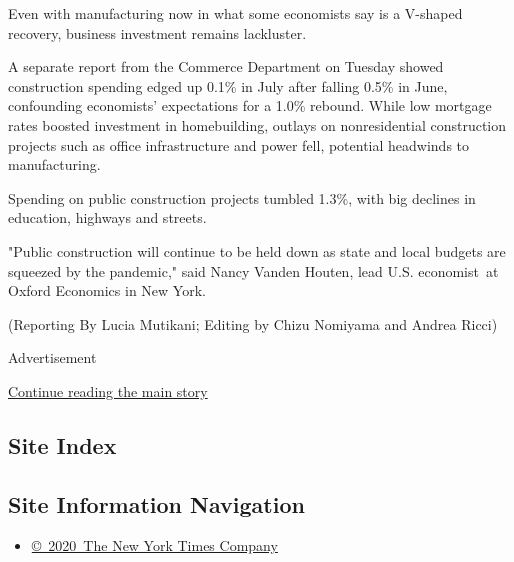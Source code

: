 Even with manufacturing now in what some economists say is a V-shaped
recovery, business investment remains lackluster.

A separate report from the Commerce Department on Tuesday showed
construction spending edged up 0.1\% in July after falling 0.5\% in
June, confounding economists' expectations for a 1.0\% rebound. While
low mortgage rates boosted investment in homebuilding, outlays on
nonresidential construction projects such as office infrastructure and
power fell, potential headwinds to manufacturing.

Spending on public construction projects tumbled 1.3\%, with big
declines in education, highways and streets.

"Public construction will continue to be held down as state and local
budgets are squeezed by the pandemic," said Nancy Vanden Houten, lead
U.S. economist~at Oxford Economics in New York.

(Reporting By Lucia Mutikani; Editing by Chizu Nomiyama and Andrea
Ricci)

Advertisement

\protect\hyperlink{after-bottom}{Continue reading the main story}

\hypertarget{site-index}{%
\subsection{Site Index}\label{site-index}}

\hypertarget{site-information-navigation}{%
\subsection{Site Information
Navigation}\label{site-information-navigation}}

\begin{itemize}
\tightlist
\item
  \href{https://help.nytimes3xbfgragh.onion/hc/en-us/articles/115014792127-Copyright-notice}{©~2020~The
  New York Times Company}
\end{itemize}

